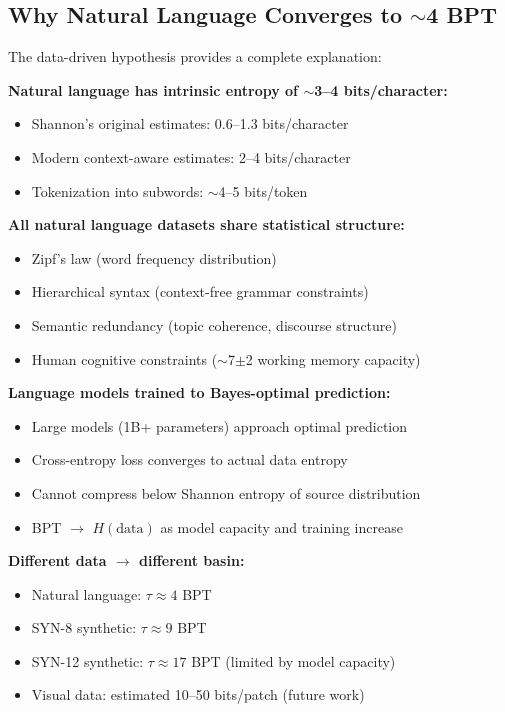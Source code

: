 \documentclass[11pt,a4paper]{article}
\begin{document}
\subsection{Why Natural Language Converges to $\sim$4 BPT}

The data-driven hypothesis provides a complete explanation:

\textbf{Natural language has intrinsic entropy of $\sim$3--4 bits/character:}
\begin{itemize}
\item Shannon's original estimates: 0.6--1.3 bits/character \cite{shannon1951}
\item Modern context-aware estimates: 2--4 bits/character
\item Tokenization into subwords: $\sim$4--5 bits/token
\end{itemize}

\textbf{All natural language datasets share statistical structure:}
\begin{itemize}
\item Zipf's law (word frequency distribution)
\item Hierarchical syntax (context-free grammar constraints)
\item Semantic redundancy (topic coherence, discourse structure)
\item Human cognitive constraints ($\sim$7$\pm$2 working memory capacity) \cite{miller1956,cowan2001}
\end{itemize}

\textbf{Language models trained to Bayes-optimal prediction:}
\begin{itemize}
\item Large models (1B+ parameters) approach optimal prediction
\item Cross-entropy loss converges to actual data entropy
\item Cannot compress below Shannon entropy of source distribution
\item BPT $\rightarrow$ $H(\text{data})$ as model capacity and training increase
\end{itemize}

\textbf{Different data $\rightarrow$ different basin:}
\begin{itemize}
\item Natural language: $\tau \approx 4$ BPT
\item SYN-8 synthetic: $\tau \approx 9$ BPT
\item SYN-12 synthetic: $\tau \approx 17$ BPT (limited by model capacity)
\item Visual data: estimated 10--50 bits/patch (future work)
\end{itemize}
\end{document}
